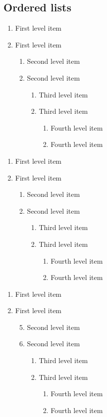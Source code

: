\documentclass{article}
\begin{document}
\subsection{Ordered lists}

\begin{enumerate}
 \item First level item
 \item First level item
 \begin{enumerate}
 \item Second level item
 \item Second level item
 \begin{enumerate}
 \item Third level item
 \item Third level item
 \begin{enumerate}
 \item Fourth level item
 \item Fourth level item
 \end{enumerate}
 \end{enumerate}
 \end{enumerate}
 \end{enumerate}
 
 \renewcommand{\labelenumii}{\Roman{enumii}}
 \begin{enumerate}
 \item First level item
 \item First level item
 \begin{enumerate}
 \item Second level item
 \item Second level item
 \begin{enumerate}
 \item Third level item
 \item Third level item
 \begin{enumerate}
 \item Fourth level item
 \item Fourth level item
 \end{enumerate}
 \end{enumerate}
 \end{enumerate}
 \end{enumerate}
 
 \begin{enumerate}
 \item First level item
 \item First level item
 \begin{enumerate}
 \setcounter{enumii}{4}
 \item Second level item
 \item Second level item
 \begin{enumerate}
 \item Third level item
 \item Third level item
 \begin{enumerate}
 \item Fourth level item
 \item Fourth level item
 \end{enumerate}
 \end{enumerate}
 \end{enumerate}
 \end{enumerate}
 
\end{document}
